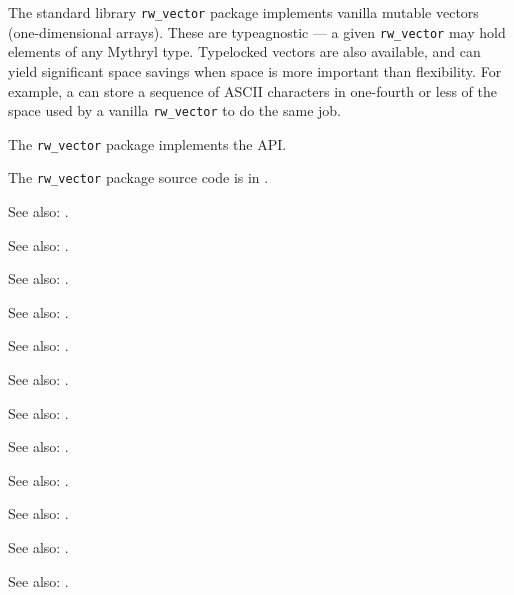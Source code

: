 
The standard library {\tt rw\_vector} package implements vanilla mutable vectors (one-dimensional arrays). 
These are typeagnostic --- a given {\tt rw\_vector} may hold elements of any Mythryl type.  Typelocked 
vectors are also available, and can yield significant space savings when space is more important than 
flexibility.  For example, a  can store a sequence of 
{\sc ASCII} characters in one-fourth or less of the space used by a vanilla {\tt rw\_vector} to do the 
same job.

The {\tt rw\_vector} package implements the  API.

The {\tt rw\_vector} package source code is in .

See also:  .

See also:  .

See also:  .

See also:  .

See also:  .

See also:  .

See also:  .

See also:  .

See also:  .

See also:  .

See also:  .

See also:  .


